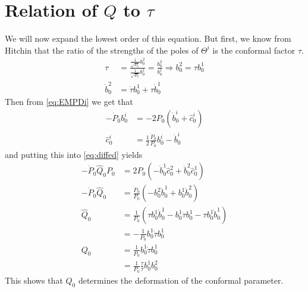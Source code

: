 \documentclass{article}
\begin{document}
\section{Relation of $Q$ to $\tau$}
We will now expand the lowest order of this equation. But first, we know from Hitchin that the ratio of the strengths of the poles of $\Theta^i$ is the conformal factor $\tau$.
\begin{align*}
\tau &= \frac{\frac{1}{\sqrt{P_0}} b^2_0}{\frac{1}{\sqrt{P_0}} b^1_0} = \frac{b^2_0}{b^1_0} \Rightarrow b^2_0 = \tau b^1_0 \\
\dot b^2_0 &= \dot\tau b^1_0 + \tau \dot b^1_0
\end{align*}
Then from \eqref{eq:EMPDi} we get that
\begin{align*}
-\dot P_0 b^i_0 &= -2P_0\left( \dot b^i_0 + \hat c^i_0 \right) \\
\hat c^i_0 &= \frac{1}{2}\frac{\dot P_0}{P_0}b^i_0 - \dot b^i_0
\end{align*}
and putting this into \eqref{eq:diffed} yields
\begin{align*}
-\dot P_0 \hat Q_0 P_0 &=  2P_0(-\dot b^1_0\hat c^2_0 + \dot b^2_0\hat c^1_0) \\
-\dot P_0 \hat Q_0 &=  \frac{\dot P_0}{P_0}(-b^2_0\dot b^1_0 + b^1_0\dot b^2_0) \\
\hat Q_0 &=  \frac{1}{P_0}(\tau b^1_0\dot b^1_0 - b^1_0\dot\tau b^1_0 - \tau b^1_0\dot b^1_0) \\
&=  -\frac{1}{P_0}b^1_0\dot\tau b^1_0 \\
Q_0 &=  \frac{1}{P_0}b^1_0\dot\tau b^1_0 \\
&= \frac{1}{P_0} \frac{\dot \tau}{\tau} b^1_0 b^2_0
\end{align*}
This shows that $Q_0$ determines the deformation of the conformal parameter.
\end{document}
